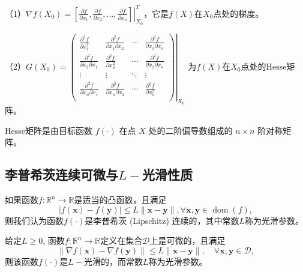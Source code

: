 （1）$\nabla f(X_0) = \left.\left[ 
        \displaystyle\frac{\partial f}{\partial x_1},
        \displaystyle\frac{\partial f}{\partial x_2},
        ...,
        \displaystyle\frac{\partial f}{\partial x_n} \right]\right|_{X_0}^T$，它是$f(X)$在$X_0$点处的梯度。
        
（2）$ G(X_0) = 
        \left.
        \begin{pmatrix}
            \displaystyle\frac{\partial^2f}{\partial x_1^2} & \displaystyle\frac{\partial^2f}{\partial x_1\partial x_2} & \cdots & \displaystyle\frac{\partial^2f}{\partial x_1\partial x_n}\\
            \displaystyle\frac{\partial^2f}{\partial x_2\partial x_1} & \displaystyle\frac{\partial^2f}{\partial x_2^2} & \cdots & \displaystyle\frac{\partial^2f}{\partial x_2\partial x_n}\\
            \vdots & \vdots & \ddots & \vdots\\
            \displaystyle\frac{\partial^2f}{\partial x_n\partial x_1} & \displaystyle\frac{\partial^2f}{\partial x_n\partial x_2} & \cdots & \displaystyle\frac{\partial^2f}{\partial x_n^2}\\
        \end{pmatrix}
        \right|_{X_0}$
        为$f(X)$在$X_0$点处的Hesse矩阵。
\begin{definition}[Hesse矩阵]
    Hesse矩阵是由目标函数 $f(\cdot)$ 在点 $X$ 处的二阶偏导数组成的 $n\times n$ 阶对称矩阵。       
\end{definition}

\subsection{李普希茨连续可微与$L-$光滑性质}
\begin{definition}[李普希茨连续]
    如果函数$f: \mathbb{R}^{n} \rightarrow \mathbb{R}$是适当的凸函数，且满足
\begin{equation}
    |f(\bm{x})-f(\bm{y})| \leq L\|\bm{x}-\bm{y}\|, \forall \bm{x}, \bm{y} \in \operatorname{dom}(f),
    \nonumber
\end{equation}
则我们认为函数$f(\cdot)$是李普希茨 (Lipschitz) 连续的，其中常数$L$称为光滑参数。
\end{definition}

\begin{definition}[$L-$光滑]
    给定$L \geq 0$, 函数$f: \mathbb{R}^{n} \rightarrow \mathbb{R}$定义在集合$\mathcal{D}$上是可微的，且满足
\begin{equation}
    \|\nabla f(\bm{x})-\nabla f(\bm{y})\| \leq L\|\bm{x}-\bm{y}\|, \quad \forall \bm{x}, \bm{y} \in \mathcal{D},
    \nonumber
\end{equation}
则该函数$f(\cdot)$是$L-$光滑的，而常数$L$称为光滑参数。
\end{definition}

